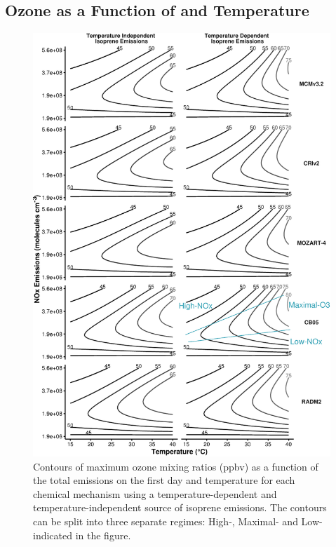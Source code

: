 \subsection[Ozone as a Function of NOx and Temperature]{Ozone as a Function of  and Temperature} \label{ss:r_contours} 
\begin{figure}%
    \centering%
    \caption{Contours of maximum ozone mixing ratios (ppbv) as a function of the total  emissions on the first day and temperature for each chemical mechanism using a temperature-dependent and temperature-independent source of isoprene emissions. The contours can be split into three separate regimes: High-, Maximal- and Low- indicated in the figure.}
    \label{f:ozone_contours}%
    \includegraphics[width=\textwidth]{img/O3_comparison}%
\end{figure}

